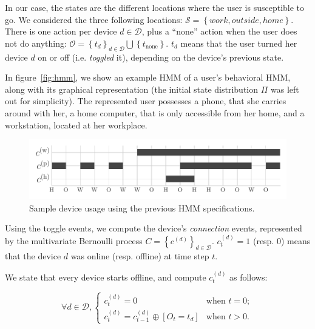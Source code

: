 In our case, the states are the different locations where the user is susceptible to go.
We considered the three following locations: $\mathcal{S}=\left\{ \mathit{work}, \mathit{outside}, \mathit{home} \right\}$. 
There is one action per device $d\in\mathcal{D}$, plus a ``none'' action when the user does not do anything: 
$\mathcal{O} = \left\{ t_d \right\}_{d\in \mathcal{D}} \bigcup \left\{ t_\text{none} \right\}$.
$t_d$ means that the user turned her device $d$ on or off (i.e. \emph{toggled} it), depending on the device's previous state.

In figure~\ref{fig:hmm}, we show an example HMM of a user's behavioral HMM, along with its graphical representation (the initial state distribution $\Pi$ was left out for simplicity). 
The represented user possesses a phone, that she carries around with her, a home computer, that is only accessible from her home, and a workstation, located at her workplace.

\begin{figure}[t]
\centering
\includegraphics[width=\columnwidth]{figures/sample_usage.pdf}

\caption{\label{fig:sample_usage}Sample device usage using the previous HMM specifications. 
}

\end{figure}

Using the toggle events, we compute the device's \emph{connection} events, represented by the multivariate Bernoulli process $C=\left\{ c^{(d)} \right\}_{d\in\mathcal{D}}$. 
$c^{(d)}_t=1$ (resp. 0) means that the device $d$ was online (resp. offline) at time step $t$.

We state that every device starts offline, and compute $c^{(d)}_t$ as follows:

$$ \forall d \in \mathcal{D},
\begin{cases}
c^{(d)}_t=0 &\text{when } t=0; \\
c^{(d)}_t=c^{(d)}_{t-1} \oplus \left[ O_t = t_d \right] &\text{when } t>0.
\end{cases}$$


